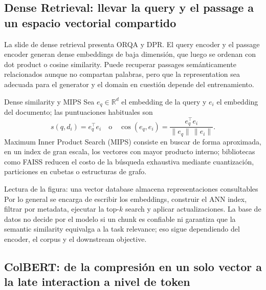 \subsection{Dense Retrieval: llevar la query y el passage a un espacio vectorial compartido}

La slide de dense retrieval presenta ORQA y DPR. El query encoder y el passage encoder generan dense embeddings de baja dimensión, que luego se ordenan con dot product o cosine similarity. Puede recuperar passages semánticamente relacionados aunque no compartan palabras, pero que la representation sea adecuada para el generator y el domain en cuestión depende del entrenamiento.


\begin{importantbox}{Dense similarity y MIPS}
Sea $e_q\in\mathbb{R}^d$ el embedding de la query y $e_i$ el embedding del documento; las puntuaciones habituales son
\[
s(q,d_i)=e_q^\top e_i
\quad\text{o}\quad
\cos(e_q,e_i)=\frac{e_q^\top e_i}{\|e_q\|\,\|e_i\|}.
\]
Maximum Inner Product Search (MIPS) consiste en buscar de forma aproximada, en un index de gran escala, los vectores con mayor producto interno; bibliotecas como FAISS reducen el costo de la búsqueda exhaustiva mediante cuantización, particiones en cubetas o estructuras de grafo.
\end{importantbox}


\begin{knowledgebox}{Lectura de la figura: una vector database almacena representaciones consultables}
Por lo general se encarga de escribir los embeddings, construir el ANN index, filtrar por metadata, ejecutar la top-$k$ search y aplicar actualizaciones. La base de datos no decide por el modelo si un chunk es confiable ni garantiza que la semantic similarity equivalga a la task relevance; eso sigue dependiendo del encoder, el corpus y el downstream objective.
\end{knowledgebox}

\subsection{ColBERT: de la compresión en un solo vector a la late interaction a nivel de token}

